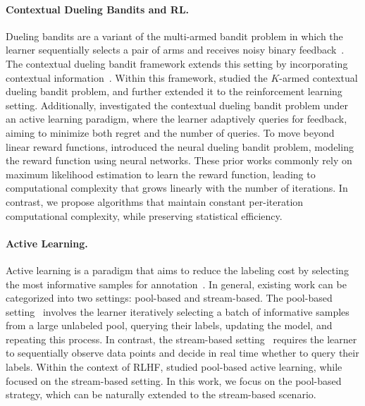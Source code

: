 \paragraph{Contextual Dueling Bandits and RL.} Dueling bandits are a variant of the multi-armed bandit problem in which the learner sequentially selects a pair of arms and receives noisy binary feedback~\citep{JCSS'12:K-armed-dueling-bandits}. The contextual dueling bandit framework extends this setting by incorporating contextual information~\citep{COLT'15:Dudik-Contextual-dueling, NeurIPS'21:Saha-Preference-bandits, ICML'22:Bengs-Stochastic-Contextual-dueling}. Within this framework, \citet{NeurIPS'21:Saha-Preference-bandits} studied the $K$-armed contextual dueling bandit problem, and \citet{AISTATS'23:Saha-Dueling-RL} further extended it to the reinforcement learning setting. Additionally, \citet{NeurIPS'24:Sekhari-Contextual-bandits} investigated the contextual dueling bandit problem under an active learning paradigm, where the learner adaptively queries for feedback, aiming to minimize both regret and the number of queries. To move beyond linear reward functions, \citet{ICLR'25:Verma-Neural-Dueling-Bandits} introduced the neural dueling bandit problem, modeling the reward function using neural networks. These prior works commonly rely on maximum likelihood estimation to learn the reward function, leading to computational complexity that grows linearly with the number of iterations. In contrast, we propose algorithms that maintain constant per-iteration computational complexity, while preserving statistical efficiency.


\paragraph{Active Learning.} Active learning is a paradigm  that aims to reduce the labeling cost by selecting the most informative samples for annotation~\citep{09:Settles-Active-learning}. In general, existing work can be categorized into two settings: pool-based and stream-based. The pool-based setting~\citep{92:Query-by-committee, MLJ'97:active, NISP'10:Huang-active} involves the learner iteratively selecting a batch of informative samples from a large unlabeled pool, querying their labels, updating the model, and repeating this process. In contrast, the stream-based setting~\citep{COLT'04:Bianchi-active, JMLR'06:Bianchi-selective, MLJ'24:Davide-active} requires the learner to sequentially observe data points and decide in real time whether to query their labels. Within the context of RLHF, \citet{arXiv'24:Das-RLHF-active} studied pool-based active learning, while \citet{arXiv'24:Ji-RLHF-active} focused on the stream-based setting. In this work, we focus on the pool-based strategy, which can be naturally extended to the stream-based scenario.

